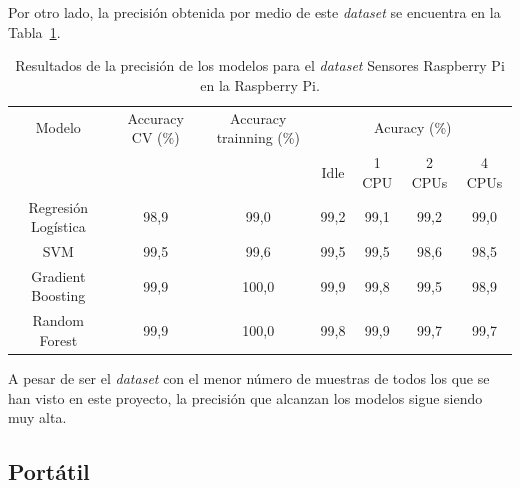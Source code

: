 \documentclass[a4paper, 12pt]{book}
\begin{document}
Por otro lado, la precisión obtenida por medio de este \textit{dataset} se encuentra en la Tabla~\ref{tab:acc_sensrasp}.\\
\begin{table}[htb]
\renewcommand{\arraystretch}{1.5}
\begin{adjustbox}{width=\textwidth}
\centering
    \begin{tabular}{c  c  c  c  c  c  c}
    \hline
    Modelo & Accuracy CV (\%) & Accuracy trainning (\%) & \multicolumn{4}{c}{Acuracy (\%)} \\
    \cline{4-7}
     &  &   &  Idle & 1 CPU & 2 CPUs & 4 CPUs \\
     \hline
     Regresión Logística & 98,9 & 99,0 & 99,2 & 99,1 & 99,2 & 99,0\\
     SVM & 99,5 & 99,6 & 99,5 & 99,5 & 98,6 & 98,5\\
     Gradient Boosting & 99,9 & 100,0 & 99,9 & 99,8 & 99,5 & 98,9\\
     Random Forest & 99,9 & 100,0 & 99,8 & 99,9 & 99,7 & 99,7\\
    \hline
    \end{tabular}
\end{adjustbox}
\caption{Resultados de la precisión de los modelos para el \textit{dataset} Sensores Raspberry Pi en la Raspberry Pi.}
\label{tab:acc_sensrasp}
\end{table}

A pesar de ser el \textit{dataset} con el menor número de muestras de todos los que se han visto en este proyecto, la precisión que alcanzan los modelos sigue siendo muy alta.

\subsection{Portátil}
\label{subsec:pc_sensados}
\end{document}
